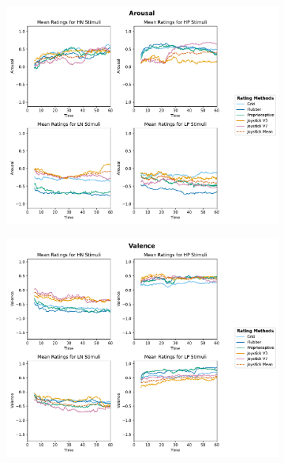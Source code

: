 \documentclass[11pt, letterpaper]{article}
\begin{document}
\begin{figure}
    \centering
    \begin{subfigure}[t]{0.49\textwidth}
        \centering
        \includegraphics[width=\linewidth]{cr_a} 
        \caption{} \label{fig:cr_a}
    \end{subfigure}
    \hfill
    \begin{subfigure}[t]{0.49\textwidth}
        \centering
        \includegraphics[width=\linewidth]{cr_v} 
        \caption{} \label{fig:cr_v}
    \end{subfigure}


\end{figure}
\end{document}
